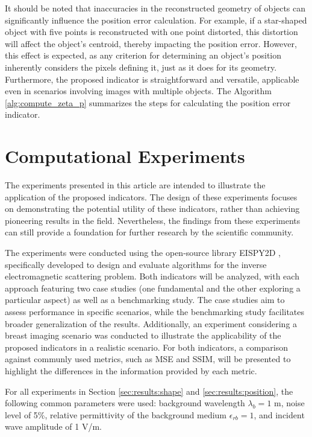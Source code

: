 \documentclass{ieeeaccess}
\begin{document}
        It should be noted that inaccuracies in the reconstructed geometry of objects can significantly influence the position error calculation. For example, if a star-shaped object with five points is reconstructed with one point distorted, this distortion will affect the object's centroid, thereby impacting the position error. However, this effect is expected, as any criterion for determining an object's position inherently considers the pixels defining it, just as it does for its geometry. Furthermore, the proposed indicator is straightforward and versatile, applicable even in scenarios involving images with multiple objects. The Algorithm \ref{alg:compute_zeta_p} summarizes the steps for calculating the position error indicator.

        

\section{Computational Experiments}\label{sec:results}

    The experiments presented in this article are intended to illustrate the application of the proposed indicators. The design of these experiments focuses on demonstrating the potential utility of these indicators, rather than achieving pioneering results in the field. Nevertheless, the findings from these experiments can still provide a foundation for further research by the scientific community.

    The experiments were conducted using the open-source library EISPY2D \cite{batista2025eispy2d}, specifically developed to design and evaluate algorithms for the inverse electromagnetic scattering problem. Both indicators will be analyzed, with each approach featuring two case studies (one fundamental and the other exploring a particular aspect) as well as a benchmarking study. The case studies aim to assess performance in specific scenarios, while the benchmarking study facilitates broader generalization of the results. Additionally, an experiment considering a breast imaging scenario was conducted to illustrate the applicability of the proposed indicators in a realistic scenario. For both indicators, a comparison against communly used metrics, such as MSE and SSIM, will be presented to highlight the differences in the information provided by each metric.

    For all experiments in Section \ref{sec:results:shape} and \ref{sec:results:position}, the following common parameters were used: background wavelength $\lambda_b = 1$ m, noise level of 5\%, relative permittivity of the background medium $\epsilon_{rb} = 1$, and incident wave amplitude of 1 V/m. 
\end{document}
